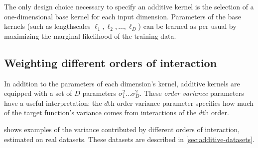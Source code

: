 The only design choice necessary to specify an additive kernel is the selection of a one-dimensional base kernel for each input dimension.
Parameters of the base kernels (such as lengthscales $\ell_1, \ell_2, \dots, \ell_D$) can be learned as per usual by maximizing the marginal likelihood of the training data.

\subsection{Weighting different orders of interaction}
In addition to the parameters of each dimension's kernel, additive kernels are equipped with a set of $D$ parameters $\sigma_1^2 \dots \sigma_D^2$.
These \emph{order variance} parameters have a useful interpretation:  the $d$th order variance parameter specifies how much of the target function's variance comes from interactions of the $d$th order.

%
%
%
 shows examples of the variance contributed by different orders of interaction, estimated on real datasets.
These datasets are described in \cref{sec:additive-datasets}.

